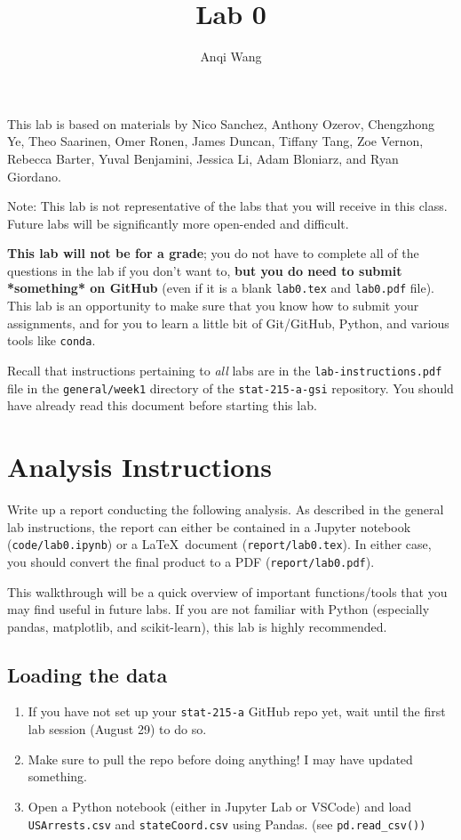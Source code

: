 \documentclass[letterpaper,12pt]{article}
\title{Lab 0}
\author{Anqi Wang}
\begin{document}
\maketitle

This lab is based on materials by Nico Sanchez, Anthony Ozerov, Chengzhong Ye, Theo Saarinen, Omer Ronen, James Duncan, Tiffany Tang, Zoe Vernon, Rebecca Barter, Yuval Benjamini, Jessica Li, Adam Bloniarz, and Ryan Giordano.

Note: This lab is not representative of the labs that you will receive in this class. Future labs will be significantly more open-ended and difficult.

\textbf{This lab will not be for a grade}; you do not have to complete all of the questions in the lab if you don't want to, \textbf{but you do need to submit *something* on GitHub} (even if it is a blank \texttt{lab0.tex} and \texttt{lab0.pdf} file). This lab is an opportunity to make sure that you know how to submit your assignments, and for you to learn a little bit of Git/GitHub, Python, and various tools like \texttt{conda}.

Recall that instructions pertaining to \textit{all} labs are in the \texttt{lab-instructions.pdf} file in the \texttt{general/week1} directory of the \texttt{stat-215-a-gsi} repository. You should have already read this document before starting this lab.

\section{Analysis Instructions}

Write up a report conducting the following analysis. As described in the general lab instructions, the report can either be contained in a Jupyter notebook (\texttt{code/lab0.ipynb}) or a \LaTeX\ document (\texttt{report/lab0.tex}). In either case, you should convert the final product to a PDF (\texttt{report/lab0.pdf}).

This walkthrough will be a quick overview of important functions/tools that you may find useful in future labs. If you are not familiar with Python (especially pandas, matplotlib, and scikit-learn), this lab is highly recommended.

\subsection{Loading the data}
\begin{enumerate}
\item If you have not set up your \texttt{stat-215-a} GitHub repo yet, wait until the first lab session (August 29) to do so.
\item Make sure to pull the repo before doing anything! I may have updated something.
\item Open a Python notebook (either in Jupyter Lab or VSCode) and load \texttt{USArrests.csv} and \texttt{stateCoord.csv} using Pandas. (see \texttt{pd.read\_csv())}
\end{enumerate}
\end{document}
